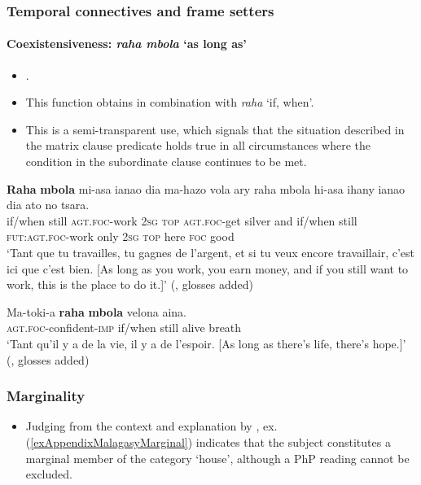 \subsubsection{Temporal connectives and frame setters}
\paragraph{Coexistensiveness: \textit{raha mbola} \lq as long as'}
\label{appendixMalagasyAsLongAs}
\begin{itemize}
	\item \textcite[457]{Dez1980}.
	\item This function obtains in combination with \textit{raha} \lq if, when'.
	\item This is a semi-transparent use, which signals that the situation described in the matrix clause predicate holds true in all circumstances where the condition in the subordinate clause continues to be met.
\end{itemize}

\begin{exe}
	\ex
	\gll \textbf{Raha} \textbf{mbola} mi-asa ianao dia ma-hazo vola ary raha mbola hi-asa ihany ianao dia ato no tsara.\\
	if/when still \textsc{agt}.\textsc{foc}-work 2\textsc{sg} \textsc{top} \textsc{agt}.\textsc{foc}-get silver and if/when still \textsc{fut}:\textsc{agt}.\textsc{foc}-work only 2\textsc{sg} \textsc{top} here \textsc{foc} good\\
	\glt \lq Tant que tu travailles, tu gagnes de l’argent, et si tu veux encore travaillair, c’est ici que c’est bien. [As long as you work, you earn money, and if you still want to work, this is the place to do it.]\rq{ }(\cite[457]{Dez1980}, glosses added)
	
	\ex\label{exAppendixMalagasyRahaMbola2}
	\gll Ma-toki-a \textbf{raha} \textbf{mbola} velona aina.\\
	\textsc{agt}.\textsc{foc}-confident-\textsc{imp} if/when still alive breath\\
	\glt \lq Tant qu'il y a de la vie, il y a de l’espoir. [As long as there's life, there's hope.]\rq{ }(\cite[157]{MalagasyPhd}, glosses added)
\end{exe}

\subsubsection{Marginality}
\label{appendixMalagassyMarginal}
\begin{itemize}
	\item Judging from the context and  explanation by \citeauthor{Dez1980}, ex. (\ref{exAppendixMalagasyMarginal}) indicates that the subject constitutes a marginal member of the category \lq house', although a PhP reading cannot be excluded.
\end{itemize}

